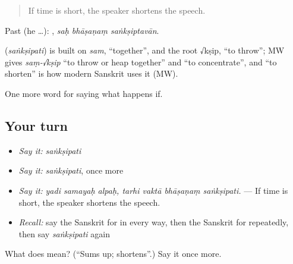 \begin{quote}
If time is short, the speaker shortens the speech.
\end{quote}

Past (he …):   , \emph{saḥ bhāṣaṇaṃ saṅkṣiptavān}.

\begin{cousinweb}
\textbf{} (\emph{saṅkṣipati}) is built on \emph{sam}, \textquotedblleft{}together\textquotedblright{}, and the root √kṣip, \textquotedblleft{}to throw\textquotedblright{}; MW gives \emph{saṃ-√kṣip} \textquotedblleft{}to throw or heap together\textquotedblright{} and \textquotedblleft{}to concentrate\textquotedblright{}, and \textquotedblleft{}to shorten\textquotedblright{} is how modern Sanskrit uses it (MW).
\end{cousinweb}

\begin{grammarlens}[title={What you've built}]
One more word for saying what happens if.
\end{grammarlens}

\subsection*{Your turn}
\begin{itemize}
\raggedright
  \item \emph{Say it:} \emph{saṅkṣipati}
  \item \emph{Say it:} \emph{saṅkṣipati}, once more
  \item \emph{Say it:} \emph{yadi samayaḥ alpaḥ, tarhi vaktā bhāṣaṇaṃ saṅkṣipati.} — If time is short, the speaker shortens the speech.
  \item \emph{Recall:} say the Sanskrit for in every way, then the Sanskrit for repeatedly, then say \emph{saṅkṣipati} again
\end{itemize}

\begin{tcolorbox}[breakable,colback=teal!4,colframe=teal!35!black,title={Before you move on}]
What does  mean? (\textquotedblleft{}Sums up; shortens\textquotedblright{}.) Say it once more.
\end{tcolorbox}
